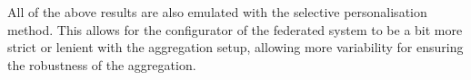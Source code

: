 \\ \\
All of the above results are also emulated with the selective personalisation method.
This allows for the configurator of the federated system to be a bit more strict or lenient with the aggregation setup, allowing more variability for ensuring the robustness of the aggregation.

